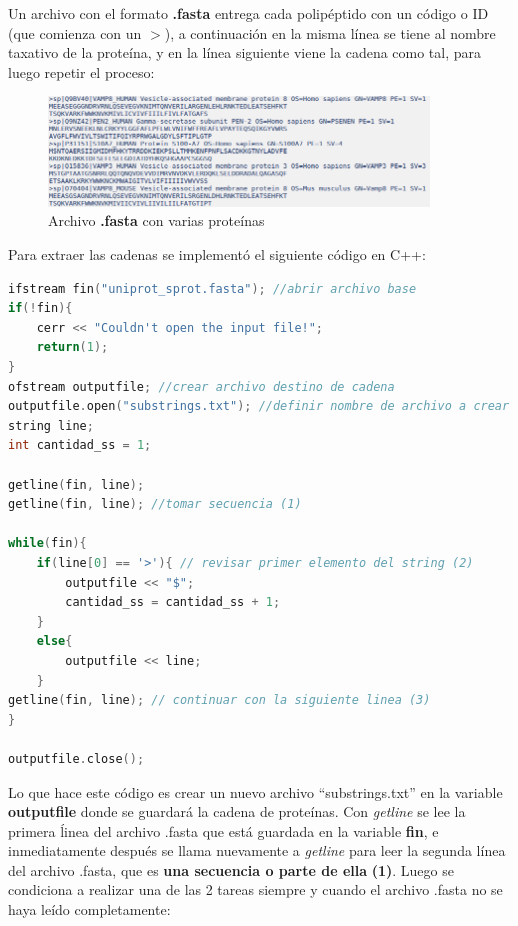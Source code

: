 Un archivo con el formato \textbf{.fasta} entrega cada polipéptido con un código o ID (que comienza con un $>$), a continuación en la misma línea se tiene al nombre taxativo de la proteína, y en la línea siguiente viene la cadena como tal, para luego repetir el proceso:

\begin{figure}[h]
    \centering
    \includegraphics[width=0.9\textwidth]{./images/fastadefecto2.png}
    \caption{Archivo \textbf{.fasta} con varias proteínas}
    \label{fig:image5}
\end{figure}

Para extraer las cadenas se implementó el siguiente código en C++:

\begin{lstlisting}[language=C++, caption=Creación de cadena de proteínas]
ifstream fin("uniprot_sprot.fasta"); //abrir archivo base
if(!fin){
	cerr << "Couldn't open the input file!";
	return(1);
}
ofstream outputfile; //crear archivo destino de cadena
outputfile.open("substrings.txt"); //definir nombre de archivo a crear
string line; 
int cantidad_ss = 1;

getline(fin, line); 
getline(fin, line); //tomar secuencia (1)

while(fin){
	if(line[0] == '>'){ // revisar primer elemento del string (2)
		outputfile << "$";
		cantidad_ss = cantidad_ss + 1;
	}
	else{
		outputfile << line;
	}
getline(fin, line); // continuar con la siguiente linea (3)
}

outputfile.close();
\end{lstlisting}

Lo que hace este código es crear un nuevo archivo ``substrings.txt'' en la variable \textbf{outputfile} donde se guardará la cadena de proteínas. Con \textit{getline} se lee la primera ĺinea del archivo .fasta que está guardada en la variable \textbf{fin}, e inmediatamente después se llama nuevamente a \textit{getline} para leer la segunda línea del archivo .fasta, que es \textbf{una secuencia o parte de ella} \textbf{(1)}. Luego se condiciona a realizar una de las 2 tareas siempre y cuando el archivo .fasta no se haya leído completamente: 

